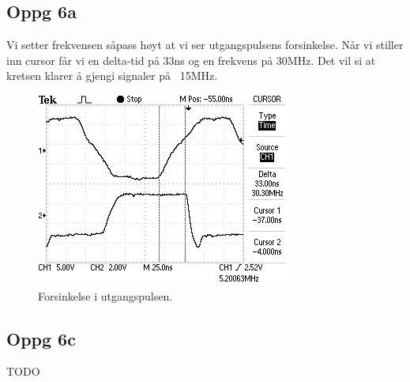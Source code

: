 \subsection{Oppg 6a}
Vi setter frekvensen såpass høyt at vi ser utgangspulsens forsinkelse.
Når vi stiller inn cursor får vi en delta-tid på 33ns og en frekvens på 30MHz.
Det vil si at kretsen klarer å gjengi signaler på ~15MHz.
\begin{figure}[H]
  \caption{Forsinkelse i utgangspulsen.}
  \centering
    \includegraphics[width=\textwidth]{6b.jpg}
\end{figure}



\subsection{Oppg 6c}
TODO
